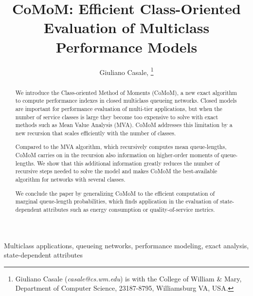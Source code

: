 \documentclass[journal,twocolumn,9.5pt]{IEEEtran}
\begin{document}
\title{CoMoM: Efficient Class-Oriented Evaluation of Multiclass Performance Models}
\author{Giuliano Casale, \thanks{Giuliano Casale ({\em casale@cs.wm.edu}) is with the College of William \& Mary, Department of Computer Science, 23187-8795, Williamsburg VA, USA.}}
\maketitle
\begin{abstract}
We introduce the {C}lass-{o}riented {M}ethod {o}f {M}oments (CoMoM), a new exact algorithm to compute performance indexes in closed multiclass queueing networks. Closed models are important for performance evaluation of multi-tier applications, but when the number of service classes is large they become too expensive to solve with exact methods such as Mean Value Analysis (MVA). CoMoM addresses this limitation by a new recursion that scales efficiently with the number of classes.

Compared to the MVA algorithm, which recursively computes mean queue-lengths, CoMoM carries on in the recursion also information on higher-order moments of queue-lengths. We show that this additional information greatly reduces the number of recursive steps needed to solve the model and makes CoMoM the best-available algorithm for networks with several classes. %

We conclude the paper by generalizing CoMoM to the efficient computation of marginal queue-length probabilities, which finds application in the evaluation of state-dependent attributes such as energy consumption or quality-of-service metrics.
\end{abstract}

\begin{keywords}
Multiclass applications, queueing networks, performance modeling, exact analysis, state-dependent attributes
\end{keywords}
\end{document}

